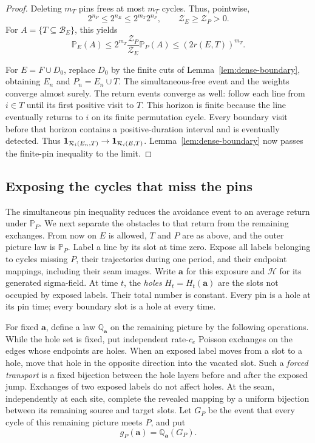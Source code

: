 \begin{proof}
Deleting $m_T$ pins frees at most $m_T$ cycles.  Thus, pointwise,
\[
 2^{n_P}\le2^{n_E}\le2^{m_T}2^{n_P},
                   \qquad \mathcal Z_E\ge\mathcal Z_P>0.
\]
For $A=\{T\subseteq\mathcal B_E\}$, this yields
\[
 \mathbb P_E(A)
   \le 2^{m_T}\frac{\mathcal Z_P}{\mathcal Z_E}\mathbb P_P(A)
   \le (2r(E,T))^{m_T}.
\]

For $E=F\cup D_0$, replace $D_0$ by the finite cuts of
Lemma~\ref{lem:dense-boundary}, obtaining $E_n$ and $P_n=E_n\cup T$.
The simultaneous-free event and the weights converge almost surely.
The return events converge as well: follow each line from $i\in T$
until its first positive visit to $T$.  This horizon is finite because
the line eventually returns to $i$ on its finite permutation cycle.
Every boundary visit before that horizon contains a positive-duration
interval and is eventually detected.  Thus
$\mathbf1_{\mathcal R_i(E_n,T)}\to\mathbf1_{\mathcal R_i(E,T)}$.
Lemma~\ref{lem:dense-boundary} now passes the finite-pin inequality
to the limit.
\end{proof}

\subsection{Exposing the cycles that miss the pins}

The simultaneous pin inequality reduces the avoidance event to an average
return under $\mathbb P_P$.  We next separate the obstacles to that
return from the remaining exchanges.  From now on $E$ is allowed,
$T$ and $P$ are as above, and the outer picture law is $\mathbb P_P$.
Label a line by its slot at time zero.  Expose all labels belonging
to cycles missing $P$, their trajectories during one period, and their
endpoint mappings, including their seam images.  Write $\mathbf a$
for this exposure and $\mathscr H$ for its generated sigma-field.
At time $t$, the \emph{holes} $H_t=H_t(\mathbf a)$ are the slots
not occupied by exposed labels.  Their total number is constant.
Every pin is a hole at its pin time; every boundary slot is a hole
at every time.

For fixed $\mathbf a$, define a law $\mathbb Q_{\mathbf a}$ on the
remaining picture by the following operations.  While the hole set
is fixed, put independent rate-$c_e$ Poisson exchanges on the edges
whose endpoints are holes.  When an exposed label moves from a slot
to a hole, move that hole in the opposite direction into the vacated
slot.  Such a \emph{forced transport} is a fixed bijection between
the hole layers before and after the exposed jump.  Exchanges of two
exposed labels do not affect holes.  At the seam, independently at
each site, complete the revealed mapping by a uniform bijection
between its remaining source and target slots.  Let $G_P$ be the
event that every cycle of this remaining picture meets $P$, and put
\[
                         g_P(\mathbf a)=\mathbb Q_{\mathbf a}(G_P).
\]

